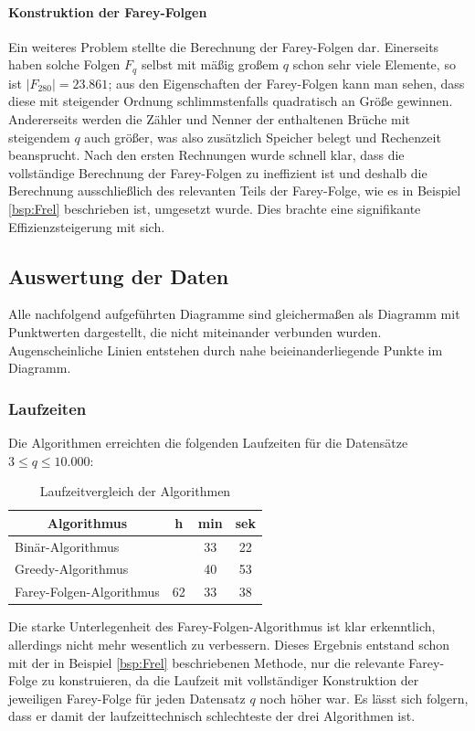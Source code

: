 \paragraph{Konstruktion der Farey-Folgen}Ein weiteres Problem stellte die Berechnung der Farey-Folgen dar. Einerseits haben solche Folgen $F_q$ selbst mit mäßig großem $q$ schon sehr viele Elemente, so ist \zB $|F_{280}| = 23.861$; aus den Eigenschaften der Farey-Folgen kann man sehen, dass diese mit steigender Ordnung schlimmstenfalls quadratisch an Größe gewinnen. Andererseits werden die Zähler und Nenner der enthaltenen Brüche mit steigendem $q$ auch größer, was also zusätzlich Speicher belegt und Rechenzeit beansprucht. Nach den ersten Rechnungen wurde schnell klar, dass die vollständige Berechnung der Farey-Folgen zu ineffizient ist und deshalb die Berechnung ausschließlich des relevanten Teils der Farey-Folge, wie es in Beispiel \ref{bsp:Frel} beschrieben ist, umgesetzt wurde. Dies brachte eine signifikante Effizienzsteigerung mit sich.


\subsection{Auswertung der Daten}
Alle nachfolgend aufgeführten Diagramme sind gleichermaßen als Diagramm mit Punktwerten dargestellt, die nicht miteinander verbunden wurden. Augenscheinliche Linien entstehen durch nahe beieinanderliegende Punkte im Diagramm.


\subsubsection{Laufzeiten}
Die Algorithmen erreichten die folgenden Laufzeiten für die Datensätze $3 \leq q \leq 10.000$:\\
\begin{table}[H]
	\centering
	\begin{tabular}{|l | c c c|}
		\hline
		\multicolumn{1}{|c|}{\textbf{Algorithmus}} & h & min & sek \\ \hline
		Binär-Algorithmus & & 33 & 22 \\ \hline
		Greedy-Algorithmus & & 40 &  53 \\ \hline
		Farey-Folgen-Algorithmus & 62 & 33 & 38 \\ \hline
	\end{tabular}
	\caption{Laufzeitvergleich der Algorithmen}
	\label{table:LaufzeitVgl}
\end{table}
Die starke Unterlegenheit des Farey-Folgen-Algorithmus ist klar erkenntlich, allerdings nicht mehr wesentlich zu verbessern. Dieses Ergebnis entstand schon mit der in Beispiel \ref{bsp:Frel} beschriebenen Methode, nur die relevante Farey-Folge zu konstruieren, da die Laufzeit mit vollständiger Konstruktion der jeweiligen Farey-Folge für jeden Datensatz $q$ noch höher war. Es lässt sich folgern, dass er damit der laufzeittechnisch schlechteste der drei Algorithmen ist.

